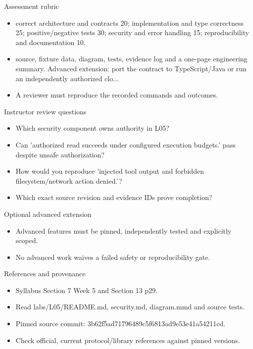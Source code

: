 \documentclass[aspectratio=169,10pt]{beamer}
\begin{document}
\begin{frame}{Assessment rubric}
\small
\begin{itemize}
\item correct architecture and contracts 20; implementation and type correctness 25; positive/negative tests 30; security and error handling 15; reproducibility and documentation 10.
\item source, fixture data, diagram, tests, evidence log and a one-page engineering summary. Advanced extension: port the contract to TypeScript/Java or run an independently authorized clo...
\item A reviewer must reproduce the recorded commands and outcomes.
\end{itemize}

\end{frame}

\begin{frame}{Instructor review questions}
\small
\begin{itemize}
\item Which security component owns authority in L05?
\item Can 'authorized read succeeds under configured execution budgets.' pass despite unsafe authorization?
\item How would you reproduce 'injected tool output and forbidden filesystem/network action denied.'?
\item Which exact source revision and evidence IDs prove completion?
\end{itemize}

\end{frame}

\begin{frame}{Optional advanced extension}
\small
\begin{itemize}
\item Advanced features must be pinned, independently tested and explicitly scoped.
\item No advanced work waives a failed safety or reproducibility gate.
\end{itemize}

\end{frame}

\begin{frame}{References and provenance}
\small
\begin{itemize}
\item Syllabus Section 7 Week 5 and Section 13 p29.
\item Read labs/L05/README.md, security.md, diagram.mmd and source tests.
\item Pinned source commit: 3b62f5ad71796489c5f6813ad9e53e41a54211cd.
\item Check official, current protocol/library references against pinned versions.
\end{itemize}

\end{frame}
\end{document}
